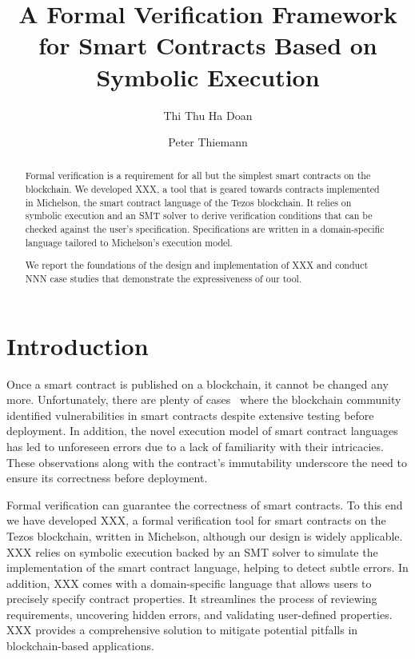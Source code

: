 \documentclass[a4paper,USenglish,cleveref, autoref, thm-restate]{lipics-v2021}
\title{A Formal Verification Framework for Smart Contracts Based on Symbolic Execution} %
\author{Thi Thu Ha Doan}{University of Freiburg,
  Germany}{doanha@informatik.uni-freiburg.de}{https://orcid.org/0000−0001−7524−4497}{Supported
by the Tezos Foundation, grant COOC }%
\author{Peter Thiemann}{University of Freiburg, Germany}{thiemann@informatik.uni-freiburg.de}{https://orcid.org/0000−0002−9000−1239}{}
\begin{document}
\maketitle

\begin{abstract}
Formal verification is a requirement for all but the simplest smart
contracts on the blockchain. We developed XXX, a tool that is geared towards contracts
implemented in Michelson, the smart contract language of the Tezos
blockchain. It relies on symbolic execution and an SMT solver to
derive verification conditions that can be checked against the user's
specification. Specifications are written in a domain-specific
language tailored to Michelson's execution model.

We report the foundations of the design and implementation of XXX and
conduct NNN case studies that demonstrate the expressiveness of our tool.
\end{abstract}

\section{Introduction}
\label{sec:introduction}

Once a smart contract is published on a blockchain, it cannot be
changed any more. Unfortunately, there are plenty of
cases~\cite{examples-for-broken-smart-contracts} where the blockchain 
community identified vulnerabilities in smart contracts despite
extensive testing before deployment.
In addition, the novel execution model of smart contract
languages has led to unforeseen errors due to a lack of familiarity
with their intricacies. These observations along with the contract's
immutability underscore the need to ensure its correctness before deployment. 

Formal verification can guarantee the correctness of smart contracts.
To this end we have developed XXX, a formal
verification tool for smart contracts on the Tezos blockchain, written in
Michelson, although our design is widely applicable. XXX relies on
symbolic execution backed by an SMT solver to simulate the
implementation of the smart contract language, helping to detect 
subtle errors. In addition, XXX comes with a domain-specific language that
allows users to precisely specify contract properties.
It streamlines the process of reviewing requirements,
uncovering hidden errors, and validating user-defined properties.
XXX provides a comprehensive solution to
mitigate potential pitfalls in blockchain-based applications. 
\end{document}
